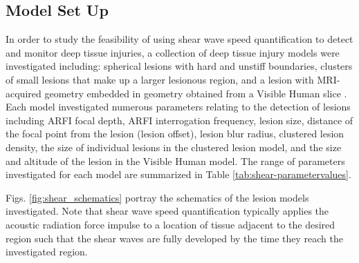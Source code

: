 		\subsection{Model Set Up}
		\label{subsec:model_setup}
			In order to study the feasibility of using shear wave speed quantification to detect and monitor deep tissue injuries, a collection of deep tissue injury models were investigated including: spherical lesions with hard and unstiff boundaries, clusters of small lesions that make up a larger lesionous region, and a lesion with MRI-acquired geometry \cite{solis13} embedded in geometry obtained from a Visible Human slice \cite{visiblehuman}. Each model investigated numerous parameters relating to the detection of lesions including ARFI focal depth, ARFI interrogation frequency, lesion size, distance of the focal point from the lesion (lesion offset), lesion blur radius, clustered lesion density, the size of individual lesions in the clustered lesion model, and the size and altitude of the lesion in the Visible Human model. The range of parameters investigated for each model are summarized in Table \ref{tab:shear-parametervalues}.

			Figs. \ref{fig:shear_schematics} portray the schematics of the lesion models investigated. Note that shear wave speed quantification typically applies the acoustic radiation force impulse to a location of tissue adjacent to the desired region such that the shear waves are fully developed by the time they reach the investigated region.

